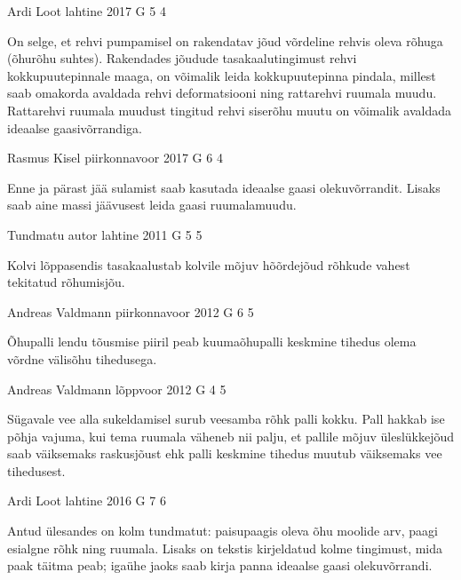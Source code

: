 \documentclass[11pt]{article}
\begin{document}
{%
{Ardi Loot} %
{lahtine} %
{2017} %
{G 5} %
{4} %
{

\ifHint
On selge, et rehvi pumpamisel on rakendatav jõud võrdeline rehvis oleva rõhuga (õhurõhu suhtes). Rakendades jõudude tasakaalutingimust rehvi kokkupuutepinnale maaga, on võimalik leida kokkupuutepinna pindala, millest saab omakorda avaldada rehvi deformatsiooni ning rattarehvi ruumala muudu. Rattarehvi ruumala muudust tingitud rehvi siserõhu muutu on võimalik avaldada ideaalse gaasivõrrandiga.
\fi
}

{Rasmus Kisel} %
{piirkonnavoor} %
{2017} %
{G 6} %
{4} %
{

\ifHint
Enne ja pärast jää sulamist saab kasutada ideaalse gaasi olekuvõrrandit. Lisaks saab aine massi jäävusest leida gaasi ruumalamuudu.
\fi
}

{Tundmatu autor} %
{lahtine} %
{2011} %
{G 5} %
{5} %
{

\ifHint
Kolvi lõppasendis tasakaalustab kolvile mõjuv hõõrdejõud rõhkude vahest tekitatud rõhumisjõu.
\fi
}

{Andreas Valdmann} %
{piirkonnavoor} %
{2012} %
{G 6} %
{5} %
{

\ifHint
Õhupalli lendu tõusmise piiril peab kuumaõhupalli keskmine tihedus olema võrdne välisõhu tihedusega.
\fi
}

{Andreas Valdmann} %
{lõppvoor} %
{2012} %
{G 4} %
{5} %
{

\ifHint
Sügavale vee alla sukeldamisel surub veesamba rõhk palli kokku. Pall hakkab ise põhja vajuma, kui tema ruumala väheneb nii palju, et pallile mõjuv üleslükkejõud saab väiksemaks raskusjõust ehk palli keskmine tihedus muutub väiksemaks vee tihedusest.
\fi
}

{Ardi Loot} %
{lahtine} %
{2016} %
{G 7} %
{6} %
{

\ifHint
Antud ülesandes on kolm tundmatut: paisupaagis oleva õhu moolide arv, paagi esialgne rõhk ning ruumala. Lisaks on tekstis kirjeldatud kolme tingimust, mida paak täitma peab; igaühe jaoks saab kirja panna ideaalse gaasi olekuvõrrandi.
\fi
}

}
\end{document}
